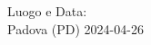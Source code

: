 \begin{samepage}

  \vspace*{\fill}
  Luogo e Data: \\
  Padova (PD) 2024-04-26
  \vspace*{18pt}

  \begin{tikzpicture}[overlay]
  \end{tikzpicture}
  
  \vspace*{20pt}
\end{samepage}
